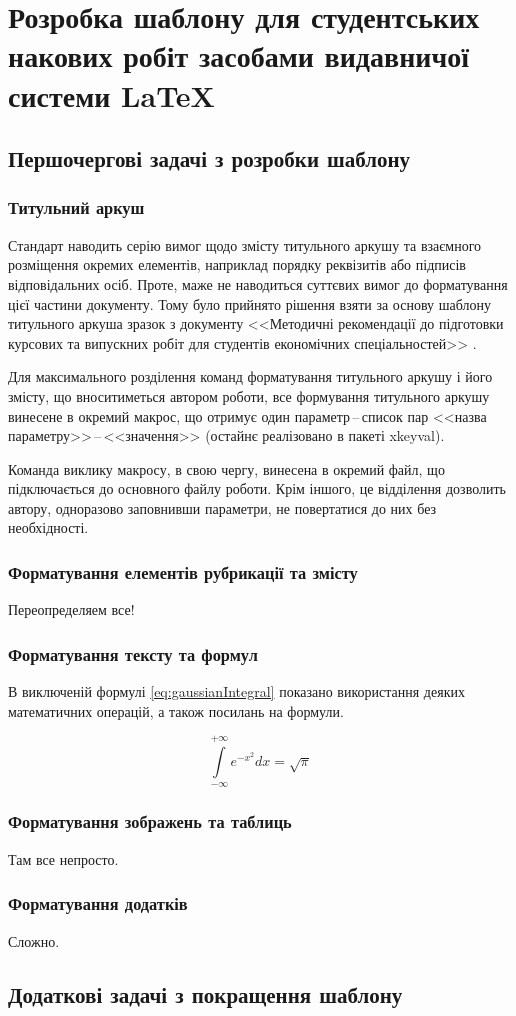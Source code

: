 \chapter{Розробка шаблону для студентських накових робіт засобами видавничої системи \LaTeX{}} 
\label{chap:second}

\section{Першочергові задачі з розробки шаблону}

\subsection{Титульний аркуш}

Стандарт наводить серію вимог \cite[с.~15]{DSTU20153008} щодо змісту титульного аркушу та взаємного розміщення окремих елементів, наприклад порядку реквізитів або підписів відповідальних осіб. Проте, маже не наводиться суттєвих вимог до форматування цієї частини документу. Тому було прийнято рішення взяти за основу шаблону титульного аркуша зразок з документу <<Методичні рекомендації до підготовки курсових та випускних робіт для студентів економічних спеціальностей>> \cite[c.~39]{doc:methodika:1}.

Для максимального розділення команд форматування титульного аркушу і його змісту, що вноситиметься автором роботи, все формування титульного аркушу винесене в окремий макрос, що отримує один параметр\,--\,список пар <<назва параметру>>\,--\,<<значення>> (остайнє реалізовано в пакеті xkeyval).

Команда виклику макросу, в свою чергу, винесена в окремий файл, що підключається до основного файлу роботи. Крім іншого, це відділення дозволить автору, одноразово заповнивши параметри, не повертатися до них без необхідності.

\subsection{Форматування елементів рубрикації та змісту}
\label{dev:toc}

Переопределяем все!

\subsection{Форматування тексту та формул}
В виключеній формулі \ref{eq:gaussianIntegral} показано використання деяких математичних операцій, а також посилань на формули.

\begin{equation}
\label{eq:gaussianIntegral}
\int\limits^{+\infty}_{-\infty} e^{-x^2} dx = \sqrt{\pi} 
\end{equation}

\subsection{Форматування зображень та таблиць}
Там все непросто.

\subsection{Форматування додатків}

Сложно.

\section{Додаткові задачі з покращення шаблону}
